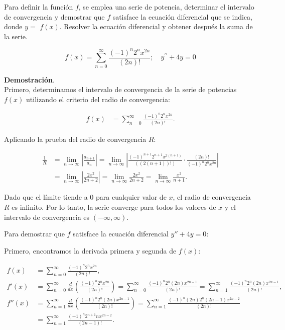 \documentclass{article}
\begin{document}
    Para definir la función $f$, se emplea una serie de potencia, determinar el intervalo de convergencia y demostrar que $f$ satisface la ecuación diferencial que se indica, donde $y=$ $f(x)$. Resolver la ecuación diferencial y obtener después la suma de la serie.

    $$
    f(x)=\sum_{n=0}^{\infty} \frac{(-1)^{n} 2^{n} x^{2 n}}{(2 n)!} ; \quad y^{\prime \prime}+4 y=0
    $$

    \textbf{Demostración}.\\

    Primero, determinamos el intervalo de convergencia de la serie de potencias $f(x)$ utilizando el criterio del radio de convergencia:

    \begin{align*}
    f(x) &= \sum_{n=0}^{\infty} \frac{(-1)^{n} 2^{n} x^{2 n}}{(2 n)!}.
    \end{align*}

    Aplicando la prueba del radio de convergencia $R$:

    \begin{align*}
    \frac{1}{R} &= \lim_{n \to \infty} \left| \frac{a_{n+1}}{a_n} \right|
    = \lim_{n \to \infty} \left| \frac{(-1)^{n+1} 2^{n+1} x^{2(n+1)}}{((2(n+1))!)} \cdot \frac{(2n)!}{(-1)^n 2^n x^{2n}} \right| \\
    &= \lim_{n \to \infty} \left| \frac{2 x^2}{2n+2} \right|
    = \lim_{n \to \infty} \frac{2 x^2}{2n+2}
    = \lim_{n \to \infty} \frac{x^2}{n+1} .
    \end{align*}

    Dado que el límite tiende a $0$ para cualquier valor de $x$, el radio de convergencia $R$ es infinito. Por lo tanto, la serie converge para todos los valores de $x$ y el intervalo de convergencia es $(-\infty, \infty)$.

    Para demostrar que $f$ satisface la ecuación diferencial \( y'' + 4y = 0 \):

    Primero, encontramos la derivada primera y segunda de $f(x)$:

    \begin{align*}
    f(x) &= \sum_{n=0}^{\infty} \frac{(-1)^{n} 2^{n} x^{2 n}}{(2 n)!}, \\
    f'(x) &= \sum_{n=0}^{\infty} \frac{d}{dx} \left( \frac{(-1)^{n} 2^{n} x^{2 n}}{(2 n)!} \right)
    = \sum_{n=0}^{\infty} \frac{(-1)^{n} 2^{n} (2n) x^{2n-1}}{(2 n)!}
    = \sum_{n=1}^{\infty} \frac{(-1)^{n} 2^{n} (2n) x^{2n-1}}{(2 n)!}, \\
    f''(x) &= \sum_{n=1}^{\infty} \frac{d}{dx} \left( \frac{(-1)^{n} 2^{n} (2n) x^{2n-1}}{(2 n)!} \right)
    = \sum_{n=1}^{\infty} \frac{(-1)^{n} (2n) 2^{n} (2n-1) x^{2n-2}}{(2 n)!} \\
    &= \sum_{n=1}^{\infty} \frac{(-1)^{n} 2^{n+1} n x^{2n-2}}{(2n-1)!}.
    \end{align*}
\end{document}
